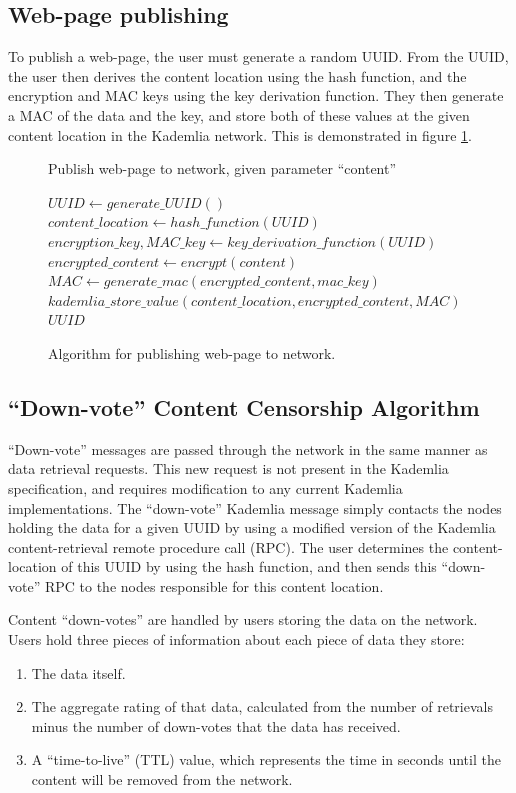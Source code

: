 \subsection{Web-page publishing}

To publish a web-page, the user must generate a random UUID.
From the UUID, the user then derives the content location using the hash function,
and the encryption and MAC keys using the key derivation function.
They then generate a MAC of the data and the key, and store both of these values at the given content location
in the Kademlia network. This is demonstrated in figure \ref{fig:publishalgo}.

\begin{figure}
    \begin{algorithm}[H]
        \caption{Publish web-page to network, given parameter ``content''}
        \begin{algorithmic}
        \STATE $ UUID \leftarrow generate\_UUID() $
        \STATE $ content\_location \leftarrow hash\_function(UUID) $
        \STATE $ encryption\_key, MAC\_key \leftarrow key\_derivation\_function(UUID) $
        \STATE $ encrypted\_content \leftarrow encrypt(content) $
        \STATE $ MAC \leftarrow generate\_mac(encrypted\_content, mac\_key) $
        \STATE $ kademlia\_store\_value(content\_location, encrypted\_content, MAC) $
        \RETURN $ UUID $
        \end{algorithmic}
    \end{algorithm}
    \caption{Algorithm for publishing web-page to network.}
    \label{fig:publishalgo}
\end{figure}

\subsection{``Down-vote'' Content Censorship Algorithm}

``Down-vote'' messages are passed through the network in the same manner as data retrieval requests. This new request is
not present in the Kademlia specification, and requires modification to any current Kademlia implementations.
The ``down-vote'' Kademlia message simply contacts the nodes holding the data for a given UUID by
using a modified version of the Kademlia content-retrieval remote procedure call (RPC). The user determines the
content-location of this UUID by using the hash function, and then sends this ``down-vote'' RPC to the nodes
responsible for this content location.

Content ``down-votes'' are handled by users storing the data on the network. Users hold three pieces of information about each piece of data they store:
\begin{enumerate}
    \item The data itself.
    \item The aggregate rating of that data, calculated from the number of retrievals minus the number of
    down-votes that the data has received.
    \item A ``time-to-live'' (TTL) value, which represents the time in seconds until the content will be removed from the network.
\end{enumerate}

